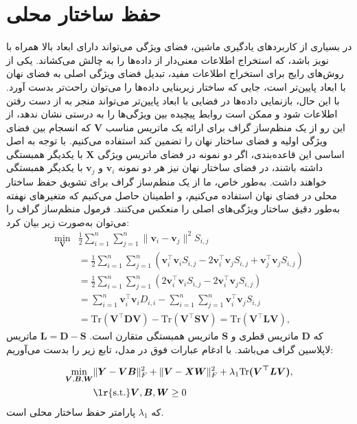 \section{حفظ ساختار محلی}\label{LS}
در بسیاری از کاربرد‌های یادگیری ماشین، فضای ویژگی می‌تواند دارای ابعاد بالا همراه با نویز باشد، که استخراج اطلاعات معنی‌دار از داده‌ها را به چالش می‌کشاند. یکی از روش‌های رایج برای استخراج اطلاعات مفید، تبدیل فضای ویژگی اصلی به فضای نهان با ابعاد پایین‌تر است، جایی که ساختار زیربنایی داده‌ها را می‌توان راحت‌تر بدست ‌آورد. با این حال، بازنمایی داده‌ها در فضایی با ابعاد پایین‌تر می‌تواند منجر به از دست رفتن اطلاعات شود و ممکن است روابط پیچیده بین ویژگی‌ها را به درستی نشان ندهد، از این رو از  یک منظم‌ساز گراف \cite{cai2010graph} برای ارائه یک ماتریس مناسب $\bm{V}$ که انسجام بین فضای ویژگی اولیه و فضای ساختار نهان را تضمین ‌کند استفاده می‌کنیم. با توجه به اصل اساسی این قاعده‌بندی، اگر دو نمونه در فضای ماتریس ویژگی $\bm{X}$ با یکدیگر همبستگی داشته باشند، در فضای ساختار نهان نیز هر دو نمونه $\bm{v}_i$ و $\bm{v}_j$ با یکدیگر همبستگی خواهند داشت. به‌طور خاص، ما از یک منظم‌ساز گراف برای تشویق حفظ ساختار محلی در فضای نهان استفاده می‌کنیم، و اطمینان حاصل می‌کنیم که متغیرهای نهفته به‌طور دقیق ساختار ویژگی‌های اصلی را منعکس می‌کنند. فرمول منظم‌ساز گراف را می‌توان به‌صورت زیر بیان کرد:
\begin{align} \label{eq:mfold}
	\min_{\bm{V}}&\frac{1}{2}\sum_{i=1}^n\sum_{j=1}^n\lVert\bm{v}_i-\bm{v}_j\rVert^2S_{i,j}\nonumber\\
	&=\frac{1}{2}\sum_{i=1}^n\sum_{j=1}^n(\bm{v}_i^\top\bm{v}_iS_{i,j}-2\bm{v}_i^\top\bm{v}_jS_{i,j}+\bm{v}_j^\top\bm{v}_jS_{i,j})\nonumber\\
	&=\frac{1}{2}\sum_{i=1}^n\sum_{j=1}^n(2\bm{v}_i^\top\bm{v}_iS_{i,j}-2\bm{v}_i^\top\bm{v}_jS_{i,j})\nonumber\\
	&=\sum_{i=1}^n\bm{v}_i^\top\bm{v}_iD_{i,i}-\sum_{i=1}^n\sum_{j=1}^n\bm{v}_i^\top\bm{v}_jS_{i,j}\nonumber\\
	&=\mathrm{Tr}(\bm{V}^\top\bm{DV})-\mathrm{Tr}(\bm{V}^\top\bm{SV})=\mathrm{Tr}(\bm{V}^\top \bm{LV}),
\end{align}
که
$\bm{D}$ ماتریس قطری و $\bm{S}$ ماتریس همبستگی متقارن است. $\bm{L} = \bm{D} - \bm{S}$ ماتریس لاپلاسین گراف می‌باشد. با ادغام عبارات فوق در مدل، تابع زیر را بدست می‌آوریم:

\begin{align}\label{eq:m-mfold}
	\min_{\bm{V},\bm{B},\bm{W}}&\lVert\bm{Y}-\bm{V}\bm{B}\rVert^2_F+\lVert\bm{V}-\bm{X}\bm{W}\rVert^2_F +\lambda_1{\mathrm{Tr}\bm{({V}^\top{LV})}}
	,\nonumber \\
	&{\text{\lr{s.t.}}}\bm{V},\bm{B},\bm{W}\geq 0
\end{align}
که 
$\lambda_1$
پارامتر حفظ ساختار محلی است.
